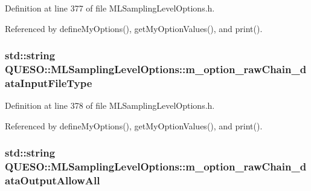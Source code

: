 Definition at line 377 of file M\-L\-Sampling\-Level\-Options.\-h.



Referenced by define\-My\-Options(), get\-My\-Option\-Values(), and print().

\hypertarget{class_q_u_e_s_o_1_1_m_l_sampling_level_options_a530bd244a5f0e9ef40f9be18ec2dae49}{
\subsubsection[{m\-\_\-option\-\_\-raw\-Chain\-\_\-data\-Input\-File\-Type}]{\setlength{\rightskip}{0pt plus 5cm}std\-::string Q\-U\-E\-S\-O\-::\-M\-L\-Sampling\-Level\-Options\-::m\-\_\-option\-\_\-raw\-Chain\-\_\-data\-Input\-File\-Type\hspace{0.3cm}{\ttfamily [private]}}}\label{class_q_u_e_s_o_1_1_m_l_sampling_level_options_a530bd244a5f0e9ef40f9be18ec2dae49}


Definition at line 378 of file M\-L\-Sampling\-Level\-Options.\-h.



Referenced by define\-My\-Options(), get\-My\-Option\-Values(), and print().

\hypertarget{class_q_u_e_s_o_1_1_m_l_sampling_level_options_a5edf0fb3329b34a79dee8d3f2187dd28}{
\subsubsection[{m\-\_\-option\-\_\-raw\-Chain\-\_\-data\-Output\-Allow\-All}]{\setlength{\rightskip}{0pt plus 5cm}std\-::string Q\-U\-E\-S\-O\-::\-M\-L\-Sampling\-Level\-Options\-::m\-\_\-option\-\_\-raw\-Chain\-\_\-data\-Output\-Allow\-All\hspace{0.3cm}{\ttfamily [private]}}}\label{class_q_u_e_s_o_1_1_m_l_sampling_level_options_a5edf0fb3329b34a79dee8d3f2187dd28}


